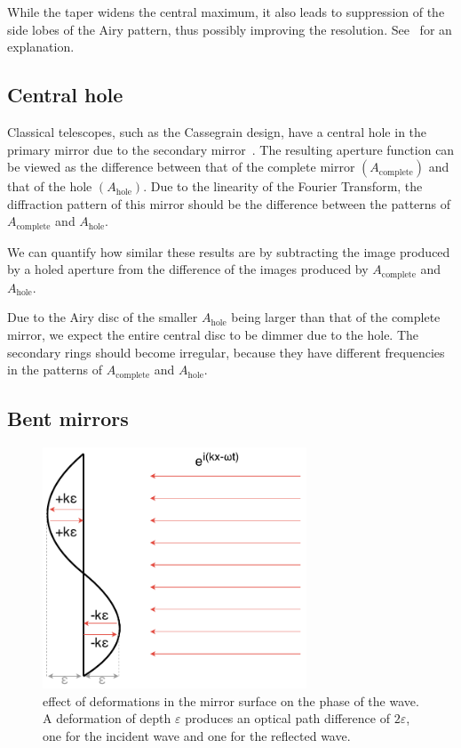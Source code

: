 \documentclass{article}
\newcommand{\R}[1]{\mathrm{#1}}
\newcommand{\eps}{\varepsilon}
\begin{document}
While the taper widens the central maximum, it also leads to suppression of the side lobes of the Airy pattern, thus possibly improving the resolution. See~\cite[Section~11.3]{hecht} for an explanation.

\subsection{Central hole}\label{sec:analysis:hole}
Classical telescopes, such as the Cassegrain design, have a central hole in the primary mirror due to the secondary mirror~\cite[Section~7.2.3]{RadioAstro}. The resulting aperture function can be viewed as the difference between that of the complete mirror $(A_{\R{complete}})$ and that of the hole $(A_{\R{hole}})$. Due to the linearity of the Fourier Transform, the diffraction pattern of this mirror should be the difference between the patterns of $A_{\R{complete}}$ and $A_{\R{hole}}$.

We can quantify how similar these results are by subtracting the image produced by a holed aperture from the difference of the images produced by $A_{\R{complete}}$ and $A_{\R{hole}}$.

Due to the Airy disc of the smaller $A_{\R{hole}}$ being larger than that of the complete mirror, we expect the entire central disc to be dimmer due to the hole. The secondary rings should become irregular, because they have different frequencies in the patterns of $A_{\R{complete}}$ and $A_{\R{hole}}$.

\subsection{Bent mirrors}\label{sec:analysis:bent}
\begin{figure}
    \centering
    \begin{minipage}{0.5\textwidth}
        \centering
        \includegraphics[width=0.7\textwidth]{pictures/mirror_dent.pdf}
    \end{minipage}%
    \hfill
    \begin{minipage}{0.4\textwidth}
        \caption{effect of deformations in the mirror surface on the phase of the wave. A deformation of depth $\eps$ produces an optical path difference of $2\eps$, one for the incident wave and one for the reflected wave.}\label{fig:bend}
    \end{minipage}
\end{figure}
\end{document}
